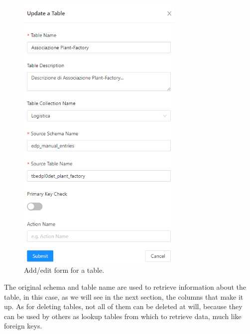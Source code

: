 \begin{figure}[!htb]
    \centering
    \includegraphics[width=8cm]{chapters/images/ch_3/FE/Admin/editTable.png}
    \caption{Add/edit form for a table.}
    \label{fig:editTab}
\end{figure}

The original schema and table name are used to retrieve information about the table, in this case, as we will see in the next section, the columns that make it up.
As for deleting tables, not all of them can be deleted at will, because they can be used by others as lookup tables from which to retrieve data, much like foreign keys.



